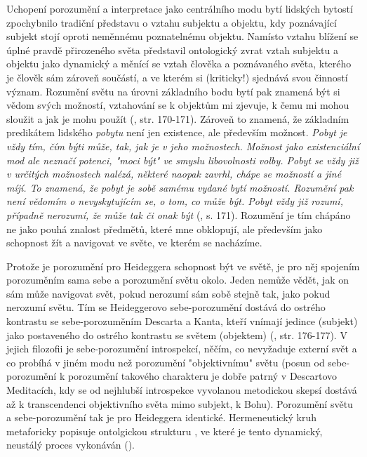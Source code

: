 \documentclass[11pt,a4paper]{article}
\begin{document}
Uchopení porozumění a interpretace jako centrálního modu bytí lidských bytostí zpochybnilo tradiční představu o vztahu subjektu a objektu, kdy poznávající subjekt stojí oproti neměnnému poznatelnému objektu. Namísto vztahu blížení se úplné pravdě přirozeného světa představil ontologický zvrat vztah subjektu a objektu jako dynamický a měnící se vztah člověka a poznávaného světa, kterého je člověk sám zároveň součástí, a ve kterém si (kriticky!) sjednává svou činností význam. Rozumění světu na úrovni základního bodu bytí pak znamená být si vědom svých možností, vztahování se k objektům mi zjevuje, k čemu mi mohou sloužit a jak je mohu použít (\cite{petricek_uvod_1992, heidegger_byti_2002}, str. 170-171).  Zároveň to znamená, že základním predikátem lidského \textit{pobytu} není jen existence, ale především možnost. \textit{Pobyt je vždy tím, čím býti může, tak, jak je v jeho možnostech. Možnost jako existenciální mod ale neznačí potenci, "moci být" ve smyslu libovolnosti volby. Pobyt se vždy již v určitých možnostech nalézá, některé naopak zavrhl, chápe se možností a jiné míjí. To znamená, že pobyt je sobě samému vydané bytí možností. Rozumění pak není vědomím o nevyskytujícím se, o tom, co může být. Pobyt vždy již rozumí, případně nerozumí, že může tak či onak být} (\cite{heidegger_byti_2002}, s. 171). Rozumění je tím chápáno ne jako pouhá znalost předmětů, které mne obklopují, ale především jako schopnost žít a navigovat ve světe, ve kterém se nacházíme.

Protože je porozumění pro Heideggera schopnost být ve světě, je pro něj spojením porozuměním sama sebe a porozumění světu okolo. Jeden nemůže vědět, jak on sám může navigovat svět, pokud nerozumí sám sobě stejně tak, jako pokud nerozumí světu. Tím se Heideggerovo sebe-porozumění dostává do ostrého kontrastu se sebe-porozuměním Descarta a Kanta, kteří vnímají jedince (subjekt) jako postaveného do ostrého kontrastu se světem (objektem) (\cite{guignon_heidegger_1993}, str. 176-177). V jejich filozofii je sebe-porozumění introspekcí, něčím, co nevyžaduje externí svět a co probíhá v jiném modu než porozumění "objektivnímu" světu (posun od sebe-porozumění k porozumění takového charakteru je dobře patrný v Descartovo Meditacích, kdy se od nejhlubší introspekce vyvolanou metodickou skepsí dostává až k transcendenci objektivního světa mimo subjekt, k Bohu). Porozumění světu a sebe-porozumění tak je pro Heideggera identické. Hermeneutický kruh metaforicky popisuje ontolgickou strukturu , ve které je tento dynamický, neustálý proces vykonáván (\cite{gadamer_wahrheit_1975}).
\end{document}
